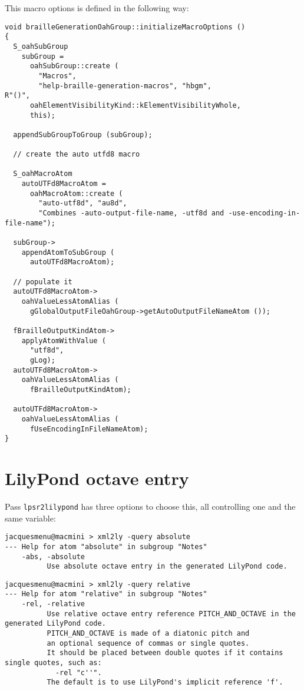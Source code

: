This macro options is defined in  the following way:
\begin{lstlisting}[language=CPlusPlus]
void brailleGenerationOahGroup::initializeMacroOptions ()
{
  S_oahSubGroup
    subGroup =
      oahSubGroup::create (
        "Macros",
        "help-braille-generation-macros", "hbgm",
R"()",
      oahElementVisibilityKind::kElementVisibilityWhole,
      this);

  appendSubGroupToGroup (subGroup);

  // create the auto utfd8 macro

  S_oahMacroAtom
    autoUTFd8MacroAtom =
      oahMacroAtom::create (
        "auto-utf8d", "au8d",
        "Combines -auto-output-file-name, -utf8d and -use-encoding-in-file-name");

  subGroup->
    appendAtomToSubGroup (
      autoUTFd8MacroAtom);

  // populate it
  autoUTFd8MacroAtom->
    oahValueLessAtomAlias (
      gGlobalOutputFileOahGroup->getAutoOutputFileNameAtom ());

  fBrailleOutputKindAtom->
    applyAtomWithValue (
      "utf8d",
      gLog);
  autoUTFd8MacroAtom->
    oahValueLessAtomAlias (
      fBrailleOutputKindAtom);

  autoUTFd8MacroAtom->
    oahValueLessAtomAlias (
      fUseEncodingInFileNameAtom);
}
\end{lstlisting}


\section{LilyPond octave entry}

Pass {\tt lpsr2lilypond} has three options to choose this, all controlling one and the same variable:
\begin{lstlisting}[language=Terminal]
jacquesmenu@macmini > xml2ly -query absolute
--- Help for atom "absolute" in subgroup "Notes"
    -abs, -absolute
          Use absolute octave entry in the generated LilyPond code.
\end{lstlisting}

\begin{lstlisting}[language=Terminal]
jacquesmenu@macmini > xml2ly -query relative
--- Help for atom "relative" in subgroup "Notes"
    -rel, -relative
          Use relative octave entry reference PITCH_AND_OCTAVE in the generated LilyPond code.
          PITCH_AND_OCTAVE is made of a diatonic pitch and
          an optional sequence of commas or single quotes.
          It should be placed between double quotes if it contains single quotes, such as:
            -rel "c''".
          The default is to use LilyPond's implicit reference 'f'.
\end{lstlisting}


